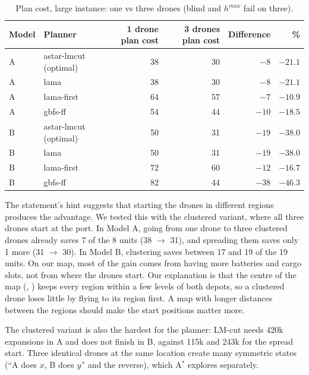 \documentclass[11pt,a4paper]{article}
\newcommand{\p}[1]{\texttt{\detokenize{#1}}}
\begin{document}
\begin{table}[H]
  \centering\small
  \begin{tabular}{@{}l l r r r r@{}}
    \toprule
    Model & Planner & 1 drone plan cost & 3 drones plan cost & Difference & \% \\
    \midrule
    A & astar-lmcut (optimal) & 38 & 30 & $-8$  & $-21.1$ \\
    A & lama                  & 38 & 30 & $-8$  & $-21.1$ \\
    A & lama-first            & 64 & 57 & $-7$  & $-10.9$ \\
    A & gbfs-ff               & 54 & 44 & $-10$ & $-18.5$ \\
    \midrule
    B & astar-lmcut (optimal) & 50 & 31 & $-19$ & $-38.0$ \\
    B & lama                  & 50 & 31 & $-19$ & $-38.0$ \\
    B & lama-first            & 72 & 60 & $-12$ & $-16.7$ \\
    B & gbfs-ff               & 82 & 44 & $-38$ & $-46.3$ \\
    \bottomrule
  \end{tabular}
  \caption{Plan cost, large instance: one vs three drones (blind and
    $h^{max}$ fail on three).}
  \label{tab:onedrone}
\end{table}

The statement's hint suggests that starting the drones in different regions
produces the advantage. We tested this with the clustered variant, where all
three drones start at the port. In Model A, going from one drone to three
clustered drones already saves 7 of the 8 units (38 $\to$ 31), and spreading
them saves only 1 more (31 $\to$ 30). In Model B, clustering saves between 17
and 19 of the 19 units. On our map, most of the gain comes from having more batteries and cargo slots, not from where
the drones start. Our explanation is that the centre of the map (\p{estacio},
\p{rambla}) keeps every region within a few levels of both depots, so a
clustered drone loses little by flying to its region first. A map with longer
distances between the regions should make the start positions matter more.

The clustered variant is also the hardest for the planner: LM-cut needs 420k
expansions in A and does not finish in B, against 115k and 243k for the spread
start. Three identical drones at the same location create many symmetric
states (``A does $x$, B does $y$'' and the reverse), which A$^*$ explores
separately.
\end{document}
